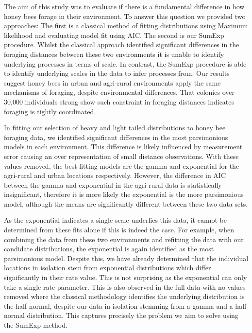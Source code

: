 \documentclass[11pt,usenames,dvipsnames,a4paper]{article}
\begin{document}
\begin{linenumbers}
\hspace{\parindent}
The aim of this study was to evaluate if there is a fundamental difference in how honey bees forage in their environment. To answer this question we provided two approaches: The first is a classical method of fitting distributions using Maximum likelihood and evaluating model fit using AIC. The second is our SumExp procedure. Whilst the classical approach identified significant differences in the foraging distances between these two environments it is unable to identify underlying processes in terms of scale. In contrast, the SumExp procedure is able to identify underlying scales in the data to infer processes from. Our results suggest honey bees in urban and agri-rural environments apply the same mechanisms of foraging, despite environmental differences. That colonies over 30,000 individuals strong show such constraint in foraging distances indicates foraging is tightly coordinated.

In fitting our selection of heavy and light tailed distributions to honey bee foraging data, we identified significant differences in the most parsimonious models in each environment. This difference is likely influenced by measurement error causing an over representation of small distance observations. With these values removed, the best fitting models are the gamma and exponential for the agri-rural and urban locations respectively. However, the difference in AIC between the gamma and exponential in the agri-rural data is statistically insignificant, therefore it is more likely the exponential is the more parsimonious model, although the means are significantly different between these two data sets.

As the exponential indicates a single scale underlies this data, it cannot be determined from these fits alone if this is indeed the case. For example, when combining the data from these two environments and refitting the data with our candidate distributions, the exponential is again identified as the most parsimonious model. Despite this, we have already determined that the individual locations in isolation stem from exponential distributions which differ significantly in their rate value. This is not surprising as the exponential can only take a single rate parameter. This is also observed in the full data with no values removed where the classical methodology identifies the underlying distribution is the half-normal, despite our data in isolation stemming from a gamma and a half normal distribution. This captures precisely the problem we aim to solve using the SumExp method. 


\end{linenumbers}
\end{document}
